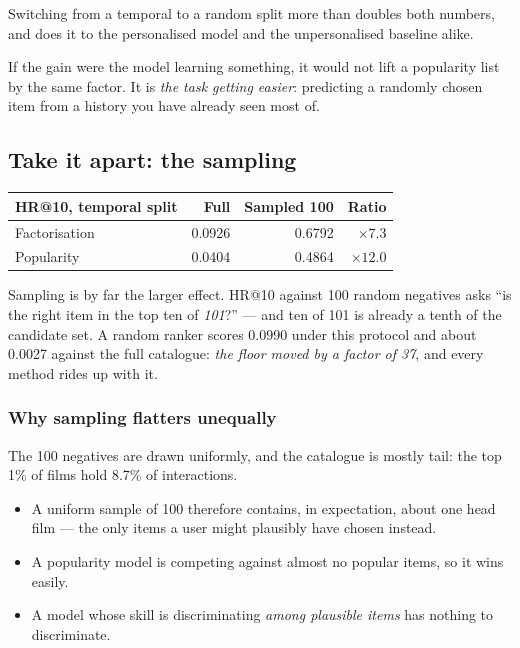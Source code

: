 \documentclass[11pt,a4paper]{article}
\begin{document}
Switching from a temporal to a random split more than doubles both numbers, and
does it to the personalised model and the unpersonalised baseline alike.

\begin{keybox}[title={That last part is the tell}]
If the gain were the model learning something, it would not lift a popularity
list by the same factor. It is \emph{the task getting easier}: predicting a
randomly chosen item from a history you have already seen most of.
\end{keybox}

\subsection{Take it apart: the sampling}

\begin{center}
\small
\begin{tabular}{lrrr}
\toprule
\textbf{HR@10, temporal split} & \textbf{Full} & \textbf{Sampled 100} &
\textbf{Ratio} \\
\midrule
Factorisation & 0.0926 & 0.6792 & $\times 7.3$ \\
Popularity    & 0.0404 & 0.4864 & $\times 12.0$ \\
\bottomrule
\end{tabular}
\end{center}

Sampling is by far the larger effect. HR@10 against 100 random negatives asks
``is the right item in the top ten of \emph{101}?'' --- and ten of 101 is
already a tenth of the candidate set. A random ranker scores 0.0990 under this
protocol and about 0.0027 against the full catalogue: \emph{the floor moved by
a factor of 37}, and every method rides up with it.

\subsubsection{Why sampling flatters unequally}

The 100 negatives are drawn uniformly, and the catalogue is mostly tail: the
top 1\% of films hold 8.7\% of interactions.

\begin{itemize}[leftmargin=*,nosep]
  \item A uniform sample of 100 therefore contains, in expectation, about one
        head film --- the only items a user might plausibly have chosen
        instead.
  \item A popularity model is competing against almost no popular items, so it
        wins easily.
  \item A model whose skill is discriminating \emph{among plausible items} has
        nothing to discriminate.
\end{itemize}
\end{document}

